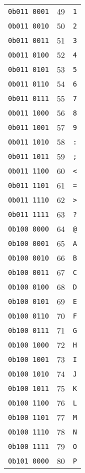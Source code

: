 {\begin{tabular}{c|r|l}
  \texttt{0b011 0001} & 49& \texttt{1} \\
  \texttt{0b011 0010} & 50& \texttt{2} \\
  \texttt{0b011 0011} & 51& \texttt{3} \\
  \texttt{0b011 0100} & 52& \texttt{4} \\
  \texttt{0b011 0101} & 53& \texttt{5} \\
  \texttt{0b011 0110} & 54& \texttt{6} \\
  \texttt{0b011 0111} & 55& \texttt{7} \\
  \texttt{0b011 1000} & 56& \texttt{8} \\
  \texttt{0b011 1001} & 57& \texttt{9} \\
  \texttt{0b011 1010} & 58& \texttt{:} \\
  \texttt{0b011 1011} & 59& \texttt{;} \\
  \texttt{0b011 1100} & 60& \texttt{<} \\
  \texttt{0b011 1101} & 61& \texttt{=} \\
  \texttt{0b011 1110} & 62& \texttt{>} \\
  \texttt{0b011 1111} & 63& \texttt{?} \\
  \texttt{0b100 0000} & 64& \texttt{@} \\
  \texttt{0b100 0001} & 65& \texttt{A} \\
  \texttt{0b100 0010} & 66& \texttt{B} \\
  \texttt{0b100 0011} & 67& \texttt{C} \\
  \texttt{0b100 0100} & 68& \texttt{D} \\
  \texttt{0b100 0101} & 69& \texttt{E} \\
  \texttt{0b100 0110} & 70& \texttt{F} \\
  \texttt{0b100 0111} & 71& \texttt{G} \\
  \texttt{0b100 1000} & 72& \texttt{H} \\
  \texttt{0b100 1001} & 73& \texttt{I} \\
  \texttt{0b100 1010} & 74& \texttt{J} \\
  \texttt{0b100 1011} & 75& \texttt{K} \\
  \texttt{0b100 1100} & 76& \texttt{L} \\
  \texttt{0b100 1101} & 77& \texttt{M} \\
  \texttt{0b100 1110} & 78& \texttt{N} \\
  \texttt{0b100 1111} & 79& \texttt{O} \\
  \texttt{0b101 0000} & 80& \texttt{P} \\

\end{tabular}}
